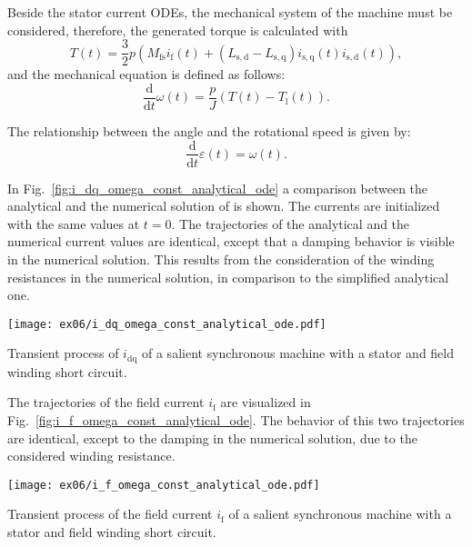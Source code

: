 \begin{solutionblock}
    Beside the stator current ODEs, the mechanical system of the machine must be considered, therefore, the generated torque is calculated with
    \begin{equation}
        T(t) = \frac{3}{2}p\left(M_{\mathrm{fs}}i_{\mathrm{f}}(t) + \left(L_{\mathrm{s,d}}-L_{\mathrm{s,q}}\right)i_{\mathrm{s,q}}(t)i_{\mathrm{s,d}}(t)\right),
    \end{equation}
    and the mechanical equation is defined as follows:
    \begin{equation}
        \frac{\mathrm{d}}{\mathrm{d}t} \omega(t) = \frac{p}{J} \left(T(t)-T_{\mathrm{l}}(t)\right).
    \end{equation}

    The relationship between the angle and the rotational speed is given by:
    \begin{equation}
        \frac{\mathrm{d}}{\mathrm{d}t} \varepsilon(t) = \omega(t).
    \end{equation}

    In Fig.~\ref{fig:i_dq_omega_const_analytical_ode} a comparison between the analytical and the numerical solution of is shown. The currents are initialized with the same values at $t=0$. The trajectories of the analytical and the numerical current values are identical, except that a damping behavior is visible in the numerical solution. This results from the consideration of the winding resistances in the numerical solution, in comparison to the simplified analytical one.
    \begin{solutionfigure}
        \centering
        \texttt{[image: ex06/i\_dq\_omega\_const\_analytical\_ode.pdf]}
        \caption{Transient process of $i_{\mathrm{dq}}$ of a salient synchronous machine with a stator and field winding short circuit.}
        \label{fig:i_dq_omega_const_analytical_ode}
    \end{solutionfigure}

    The trajectories of the field current $i_{\mathrm{f}}$ are visualized in Fig.~\ref{fig:i_f_omega_const_analytical_ode}. The behavior of this two trajectories are identical, except to the damping in the numerical solution, due to the considered winding resistance.
    \begin{solutionfigure}
        \centering
        \texttt{[image: ex06/i\_f\_omega\_const\_analytical\_ode.pdf]}
        \caption{Transient process of the field current $i_{\mathrm{f}}$ of a salient synchronous machine with a stator and field winding short circuit.}
        \label{fig:i_f_omega_const_analytical_ode}
    \end{solutionfigure}

\end{solutionblock}

